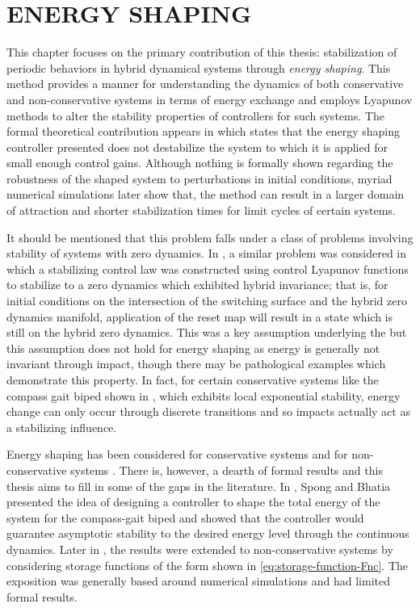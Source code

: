 \chapter{\uppercase{Energy Shaping}} \label{ch:energy-shaping}

This chapter focuses on the primary contribution of this thesis: stabilization
of periodic behaviors in hybrid dynamical systems through {\em energy shaping}.
% 
This method provides a manner for understanding the dynamics of both
conservative and  non-conservative systems in terms of energy exchange and
employs Lyapunov methods to alter the stability properties of controllers for
such systems.
% 
The formal theoretical contribution appears in 
which states that the energy shaping controller presented does not destabilize
the system to which it is applied for small enough control gains.
% 
Although nothing is formally shown regarding the robustness of the shaped system
to perturbations in initial conditions, myriad numerical simulations later show
that, the method can result in a larger domain of attraction and shorter
stabilization times for limit cycles of certain systems.

It should be mentioned that this problem falls under a class of problems
involving stability of systems with zero dynamics.
% 
In \cite{Ames2014}, a similar problem was considered in which a stabilizing
control law was constructed using control Lyapunov functions to stabilize to a
zero dynamics which exhibited hybrid invariance;
% 
that is, for initial conditions on the intersection of the switching surface and
the hybrid zero dynamics manifold, application of the reset map will result in a
state which is still on the hybrid zero dynamics.
% 
This was a key assumption underlying the \cite{Ames2014} but this assumption
does not hold for energy shaping as energy is generally not invariant through
impact, though there may be pathological examples which demonstrate this
property.
% 
In fact, for certain conservative systems like the compass gait biped shown in
, which exhibits local exponential
stability, energy change can only occur through discrete transitions and so
impacts actually act as a stabilizing influence.

Energy shaping has been considered for conservative systems \cite{Spong2003} and
for non-conservative systems \cite{Spong2007}.
% 
There is, however, a dearth of formal results and this thesis aims to fill in
some of the gaps in the literature.
% 
In \cite{Spong2003}, Spong and Bhatia presented the idea of designing a
controller to shape the total energy of the system for the compass-gait biped
and showed that the controller would guarantee asymptotic stability to the
desired energy level through the continuous dynamics.
% 
Later in \cite{Spong2007}, the results were extended to non-conservative systems
by considering storage functions of the form shown in
\eqref{eq:storage-function-Fnc}.
% 
The exposition was generally based around numerical simulations and had limited
formal results.

